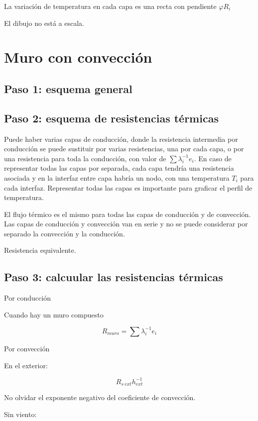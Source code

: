 \documentclass[12pt]{article}
\begin{document}
La variación de temperatura en cada capa es una recta con pendiente $ \varphi R_i $

El dibujo no está a escala.

\section{Muro con convección}

\subsection{Paso 1: esquema general}

\subsection{Paso 2: esquema de resistencias térmicas}

Puede haber varias capas de conducción, donde la resistencia intermedia por conducción se puede sustituir por varias resistencias, una por cada capa, o por una resistencia para toda la conducción, con valor de $ \sum{ \lambda ^{ -1 } _i } e_i $. En caso de representar todas las capas por separada, cada capa tendría una resistencia asociada y en la interfaz entre capa habría un nodo, con una temperatura $ T_i $ para cada interfaz. Representar todas las capas es importante para graficar el perfil de temperatura.

El flujo térmico es el mismo para todas las capas de conducción y de convección. Las capas de conducción y convección van en serie y no se puede considerar por separado la convección y la conducción.

Resistencia equivalente.

\subsection{Paso 3: calcuular las resistencias térmicas}

Por conducción

Cuando hay un muro compuesto

\[ R_{ muro } = \sum{ \lambda ^{ -1 } _i e_i } \]

Por convección

En el exterior:

\[ R_{ s \ ext } h_{ ext } ^{ -1 } \]

No olvidar el exponente negativo del coeficiente de convección.

Sin viento:
\end{document}
